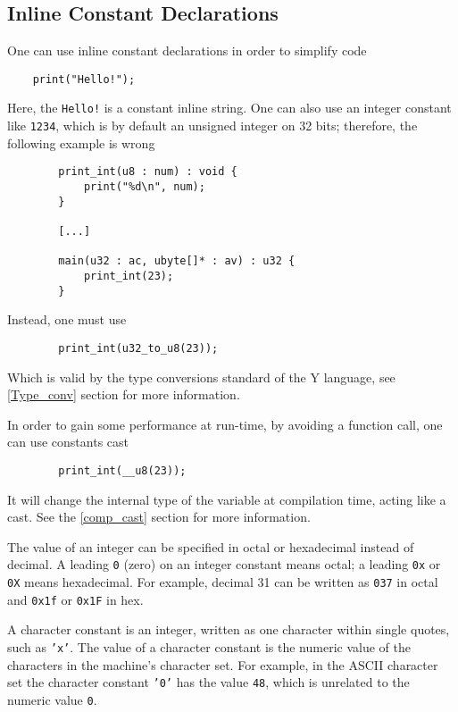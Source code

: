 \subsection{Inline Constant Declarations}

One can use inline constant declarations in order to simplify code

\begin{lstlisting}
    print("Hello!");
\end{lstlisting}
Here, the \texttt{Hello!} is a constant inline string. One can also
use an integer constant like \texttt{1234}, which is by default an
unsigned integer on 32 bits; therefore, the following example is wrong
\begin{lstlisting}
        print_int(u8 : num) : void {
            print("%d\n", num);
        }

        [...]

        main(u32 : ac, ubyte[]* : av) : u32 {
            print_int(23);
        }
\end{lstlisting}
Instead, one must use
\begin{lstlisting}
        print_int(u32_to_u8(23));
\end{lstlisting}
Which is valid by the type conversions standard of the Y language, see
\ref{Type_conv} section for more information.

In order to gain some performance at run-time, by avoiding a function call,
one can use constants cast
\begin{lstlisting}
        print_int(__u8(23));
\end{lstlisting}
It will change the internal type of the variable at compilation time,
acting like a cast. See the \ref{comp_cast} section for more information.

The value of an integer can be specified in octal or hexadecimal
instead of decimal. A leading \texttt{0} (zero) on an integer
constant means octal; a leading \texttt{0x} or \texttt{0X} means
hexadecimal.  For example, decimal 31 can be written as
\texttt{037} in octal and \texttt{0x1f} or \texttt{0x1F} in hex.

A character constant is an integer, written as one character within
single quotes, such as \texttt{'x'}. The value of a character constant
is the numeric value of the characters in the machine's character set.
For example, in the ASCII character set the character constant \texttt{'0'}
has the value \texttt{48}, which is unrelated to the numeric value \texttt{0}.

